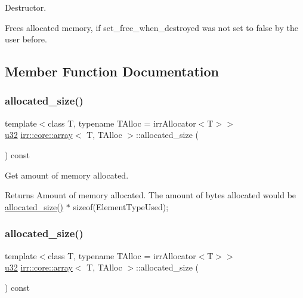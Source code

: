 Destructor. 

Frees allocated memory, if set\+\_\+free\+\_\+when\+\_\+destroyed was not set to false by the user before. 

\subsection{Member Function Documentation}
\mbox{\label{classirr_1_1core_1_1array_a21e5b20b7a56ba174b19b6c36c78a14b}} 
\subsubsection{\texorpdfstring{allocated\+\_\+size()}{allocated\_size()}\hspace{0.1cm}{\footnotesize\ttfamily [1/2]}}
{\footnotesize\ttfamily template$<$class T, typename T\+Alloc = irr\+Allocator$<$\+T$>$$>$ \\
\hyperlink{namespaceirr_a0416a53257075833e7002efd0a18e804}{u32} \hyperlink{classirr_1_1core_1_1array}{irr\+::core\+::array}$<$ T, T\+Alloc $>$\+::allocated\+\_\+size (\begin{DoxyParamCaption}{ }\end{DoxyParamCaption}) const\hspace{0.3cm}{\ttfamily [inline]}}



Get amount of memory allocated. 

\begin{DoxyReturn}{Returns}
Amount of memory allocated. The amount of bytes allocated would be \hyperlink{classirr_1_1core_1_1array_a21e5b20b7a56ba174b19b6c36c78a14b}{allocated\+\_\+size()} $\ast$ sizeof(\+Element\+Type\+Used); 
\end{DoxyReturn}
\mbox{\label{classirr_1_1core_1_1array_a21e5b20b7a56ba174b19b6c36c78a14b}} 
\subsubsection{\texorpdfstring{allocated\+\_\+size()}{allocated\_size()}\hspace{0.1cm}{\footnotesize\ttfamily [2/2]}}
{\footnotesize\ttfamily template$<$class T, typename T\+Alloc = irr\+Allocator$<$\+T$>$$>$ \\
\hyperlink{namespaceirr_a0416a53257075833e7002efd0a18e804}{u32} \hyperlink{classirr_1_1core_1_1array}{irr\+::core\+::array}$<$ T, T\+Alloc $>$\+::allocated\+\_\+size (\begin{DoxyParamCaption}{ }\end{DoxyParamCaption}) const\hspace{0.3cm}{\ttfamily [inline]}}



